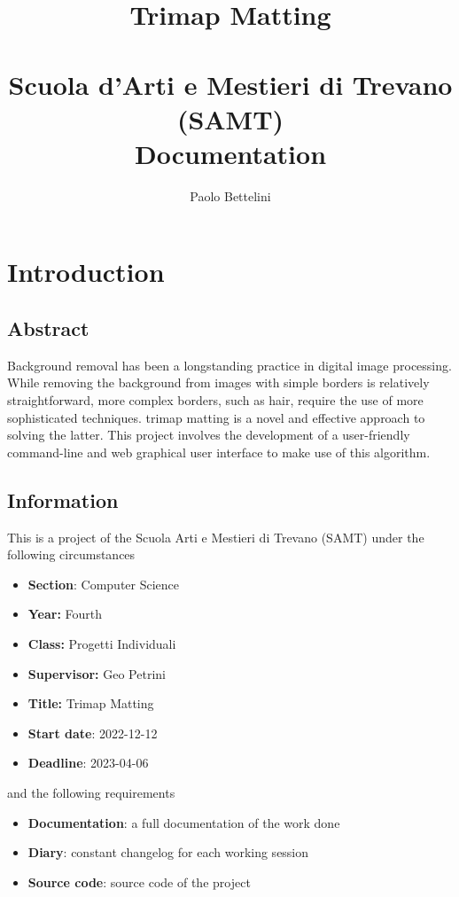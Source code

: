 \documentclass[a4paper]{article}
\title{%
    Trimap Matting \\
    \phantom{} \\
    \large Scuola d'Arti e Mestieri di Trevano (SAMT) \\
    \large Documentation
}
\author{Paolo Bettelini}
\date{}
\begin{document}
\maketitle

\pagebreak

\tableofcontents

\pagebreak

\section{Introduction}

\subsection{Abstract}

Background removal has been a longstanding practice in digital image processing.
While removing the background from images with simple borders is relatively straightforward,
more complex borders, such as hair, require the use of more sophisticated techniques.
\Gls{trimap} \gls{matting} is a novel and effective approach to solving the latter.
This project involves the development of a user-friendly command-line and web graphical user interface
to make use of this algorithm.

\subsection{Information}

This is a project of the Scuola Arti e Mestieri di Trevano (SAMT) under the following circumstances

\begin{itemize}
    \item \textbf{Section}: Computer Science
    \item \textbf{Year:} Fourth
    \item \textbf{Class:} Progetti Individuali
    \item \textbf{Supervisor:} Geo Petrini
    \item \textbf{Title:} Trimap Matting
    \item \textbf{Start date}: 2022-12-12
    \item \textbf{Deadline}: 2023-04-06
\end{itemize}

and the following requirements

\begin{itemize}
    \item \textbf{Documentation}: a full documentation of the work done
    \item \textbf{Diary}: constant changelog for each working session
    \item \textbf{Source code}: source code of the project
\end{itemize}
\end{document}
